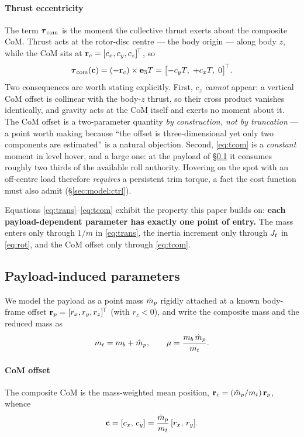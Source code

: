 \paragraph{Thrust eccentricity} The term $\boldsymbol{\tau}_{\mathrm{com}}$ is the moment the
collective thrust exerts about the composite CoM. Thrust acts at the
rotor-disc centre --- the body origin --- along body $z$, while the CoM
sits at $\mathbf{r}_c = [c_x, c_y, c_z]^{\!\top}$, so
\begin{equation}
\boldsymbol{\tau}_{\mathrm{com}}(\mathbf{c}) = (-\mathbf{r}_c) \times \mathbf{e}_3 T = \bigl[-c_y T,\; +c_x T,\; 0\bigr]^{\!\top}.
\label{eq:tcom}
\end{equation}
Two consequences are worth stating explicitly. First, $c_z$ \emph{cannot}
appear: a vertical CoM offset is collinear with the body-$z$ thrust, so
their cross product vanishes identically, and gravity acts at the CoM
itself and exerts no moment about it. The CoM offset is a two-parameter
quantity \emph{by construction, not by truncation} --- a point worth making
because ``the offset is three-dimensional yet only two components are
estimated'' is a natural objection. Second, \eqref{eq:tcom} is a
\emph{constant} moment in level hover, and a large one: at the payload of
\S\ref{sec:model:payload} it consumes roughly two thirds of the available
roll authority. Hovering on the spot with an off-centre load therefore
\emph{requires} a persistent trim torque, a fact the cost function must
also admit (\S\ref{sec:model:ctrl}).

Equations \eqref{eq:trans}--\eqref{eq:tcom} exhibit the property this
paper builds on: \textbf{each payload-dependent parameter has exactly one
point of entry.} The mass enters only through $1/m$ in \eqref{eq:trans},
the inertia increment only through $J_t$ in \eqref{eq:rot}, and the CoM
offset only through \eqref{eq:tcom}.

\subsection{Payload-induced parameters}\label{sec:model:payload}

We model the payload as a point mass $\hat{m}_p$ rigidly attached at a known
body-frame offset $\mathbf{r}_p = [r_x, r_y, r_z]^{\!\top}$ (with $r_z < 0$), and
write the composite mass and the reduced mass as
\begin{equation}
m_t = m_b + \hat{m}_p, \qquad \mu = \frac{m_b\, \hat{m}_p}{m_t}.
\label{eq:mu}
\end{equation}

\paragraph{CoM offset} The composite CoM is the mass-weighted mean
position, $\mathbf{r}_c = (\hat{m}_p/m_t)\, \mathbf{r}_p$, whence
\begin{equation}
\mathbf{c} = [c_x,\, c_y] = \frac{\hat{m}_p}{m_t}\, [r_x,\, r_y].
\label{eq:cxy}
\end{equation}

